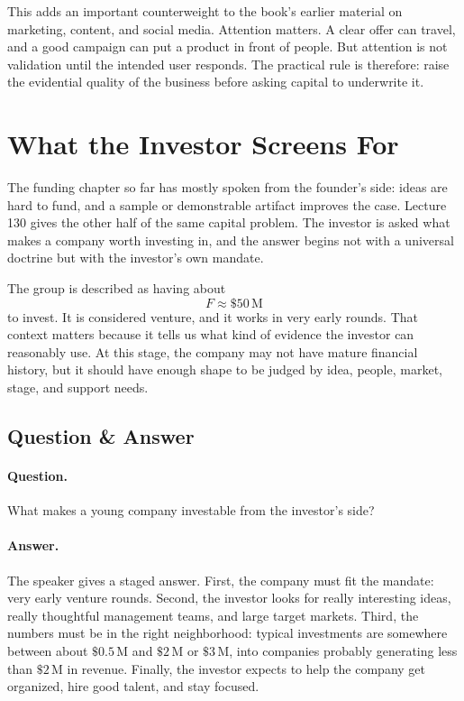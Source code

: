 \documentclass[11pt,oneside]{book}
\begin{document}
This adds an important counterweight to the book's earlier material on marketing, content, and social media. Attention matters. A clear offer can travel, and a good campaign can put a product in front of people. But attention is not validation until the intended user responds. The practical rule is therefore: raise the evidential quality of the business before asking capital to underwrite it.


\section{What the Investor Screens For}

The funding chapter so far has mostly spoken from the founder's side: ideas are hard to fund, and a sample or demonstrable artifact improves the case. Lecture 130 gives the other half of the same capital problem. The investor is asked what makes a company worth investing in, and the answer begins not with a universal doctrine but with the investor's own mandate.

The group is described as having about
\[
F\approx \$50\,\mathrm{M}
\]
to invest. It is considered venture, and it works in very early rounds. That context matters because it tells us what kind of evidence the investor can reasonably use. At this stage, the company may not have mature financial history, but it should have enough shape to be judged by idea, people, market, stage, and support needs.

\subsection{Question \& Answer}

\paragraph{Question.}
What makes a young company investable from the investor's side?

\paragraph{Answer.}
The speaker gives a staged answer. First, the company must fit the mandate: very early venture rounds. Second, the investor looks for really interesting ideas, really thoughtful management teams, and large target markets. Third, the numbers must be in the right neighborhood: typical investments are somewhere between about \( \$0.5\,\mathrm{M} \) and \( \$2\,\mathrm{M} \) or \( \$3\,\mathrm{M} \), into companies probably generating less than \( \$2\,\mathrm{M} \) in revenue. Finally, the investor expects to help the company get organized, hire good talent, and stay focused.
\end{document}
